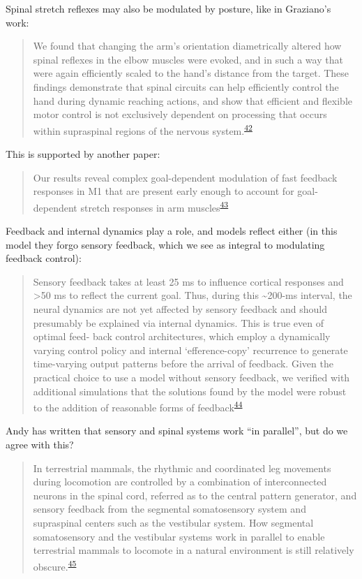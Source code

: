 \documentclass[
  a4paper,
]{article}
\begin{document}
Spinal stretch reflexes may also be modulated by posture, like in
Graziano's work:

\begin{quote}
We found that changing the arm's orientation diametrically altered how
spinal reflexes in the elbow muscles were evoked, and in such a way that
were again efficiently scaled to the hand's distance from the target.
These findings demonstrate that spinal circuits can help efficiently
control the hand during dynamic reaching actions, and show that
efficient and flexible motor control is not exclusively dependent on
processing that occurs within supraspinal regions of the nervous
system.\textsuperscript{\protect\hyperlink{ref-weiler2020}{42}}
\end{quote}

This is supported by another paper:

\begin{quote}
Our results reveal complex goal-dependent modulation of fast feedback
responses in M1 that are present early enough to account for
goal-dependent stretch responses in arm
muscles\textsuperscript{\protect\hyperlink{ref-pruszynski2014}{43}}
\end{quote}

Feedback and internal dynamics play a role, and models reflect either
(in this model they forgo sensory feedback, which we see as integral to
modulating feedback control):

\begin{quote}
Sensory feedback takes at least 25 ms to influence cortical responses
and \textgreater50 ms to reflect the current goal. Thus, during this
\textasciitilde200-ms interval, the neural dynamics are not yet affected
by sensory feedback and should presumably be explained via internal
dynamics. This is true even of optimal feed- back control architectures,
which employ a dynamically varying control policy and internal
`efference-copy' recurrence to generate time-varying output patterns
before the arrival of feedback. Given the practical choice to use a
model without sensory feedback, we verified with additional simulations
that the solutions found by the model were robust to the addition of
reasonable forms of
feedback\textsuperscript{\protect\hyperlink{ref-sussillo2015}{44}}
\end{quote}

Andy has written that sensory and spinal systems work ``in parallel'',
but do we agree with this?

\begin{quote}
In terrestrial mammals, the rhythmic and coordinated leg movements
during locomotion are controlled by a combination of interconnected
neurons in the spinal cord, referred as to the central pattern
generator, and sensory feedback from the segmental somatosensory system
and supraspinal centers such as the vestibular system. How segmental
somatosensory and the vestibular systems work in parallel to enable
terrestrial mammals to locomote in a natural environment is still
relatively
obscure.\textsuperscript{\protect\hyperlink{ref-akayRelativeContributionProprioceptive2021}{45}}
\end{quote}
\end{document}

